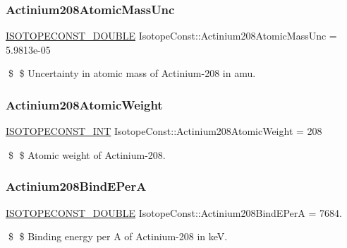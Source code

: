 \subsubsection{\texorpdfstring{Actinium208\+Atomic\+Mass\+Unc}{Actinium208AtomicMassUnc}}
{\footnotesize\ttfamily \mbox{\hyperlink{group___isotope_const-_macros_ga8f45a7272ce02c0b4c65c44636ed719a}{I\+S\+O\+T\+O\+P\+E\+C\+O\+N\+S\+T\+\_\+\+D\+O\+U\+B\+LE}} Isotope\+Const\+::\+Actinium208\+Atomic\+Mass\+Unc = 5.\+9813e-\/05}

\$ \$ Uncertainty in atomic mass of Actinium-\/208 in amu. \mbox{\label{group___isotope_const-_actinium-_ac208_ga0d0db164b2cf2b80c0f5697e4f9180ae}} 
\subsubsection{\texorpdfstring{Actinium208\+Atomic\+Weight}{Actinium208AtomicWeight}}
{\footnotesize\ttfamily \mbox{\hyperlink{group___isotope_const-_macros_ga5f18360b3e99483a35c32d789e62621c}{I\+S\+O\+T\+O\+P\+E\+C\+O\+N\+S\+T\+\_\+\+I\+NT}} Isotope\+Const\+::\+Actinium208\+Atomic\+Weight = 208}

\$ \$ Atomic weight of Actinium-\/208. \mbox{\label{group___isotope_const-_actinium-_ac208_ga90c75cd6946ebec2a1bf73c4c44552f4}} 
\subsubsection{\texorpdfstring{Actinium208\+Bind\+E\+PerA}{Actinium208BindEPerA}}
{\footnotesize\ttfamily \mbox{\hyperlink{group___isotope_const-_macros_ga8f45a7272ce02c0b4c65c44636ed719a}{I\+S\+O\+T\+O\+P\+E\+C\+O\+N\+S\+T\+\_\+\+D\+O\+U\+B\+LE}} Isotope\+Const\+::\+Actinium208\+Bind\+E\+PerA = 7684.}

\$ \$ Binding energy per A of Actinium-\/208 in keV. \mbox{\label{group___isotope_const-_actinium-_ac208_ga8ec5e2c6689b5235ad08d5b581298c43}} 
